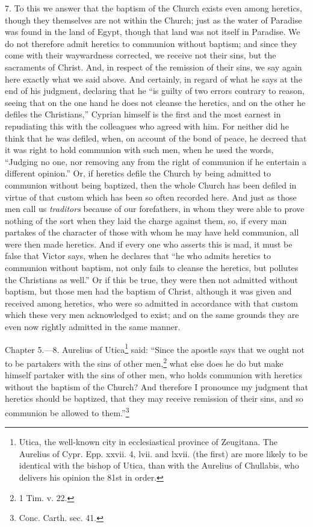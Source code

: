 7. To this we answer that the baptism of the Church exists even among heretics, though they themselves are not within the Church; just as the water of Paradise was found in the land of Egypt, though that land was not itself in Paradise. We do not therefore admit heretics to communion without baptism; and since they come with their waywardness corrected, we receive not their sins, but the sacraments of Christ. And, in respect of the remission of their sins, we say again here exactly what we said above. And certainly, in regard of what he says at the end of his judgment, declaring that he ``is guilty of two errors contrary to reason, seeing that on the one hand he does not cleanse the heretics, and on the other he defiles the Christians,'' Cyprian himself is the first and the most earnest in repudiating this with the colleagues who agreed with him. For neither did he think that he was defiled, when, on account of the bond of peace, he decreed that it was right to hold communion with such men, when he used the words, ``Judging no one, nor removing any from the right of communion if he entertain a different opinion.'' Or, if heretics defile the Church by being admitted to communion without being baptized, then the whole Church has been defiled in virtue of that custom which has been so often recorded here. And just as those men call us \emph{traditors} because of our forefathers, in whom they were able to prove nothing of the sort when they laid the charge against them, so, if every man partakes of the character of those with whom he may have held communion, all were then made heretics. And if every one who asserts this is mad, it must be false that Victor says, when he declares that ``he who admits heretics to communion without baptism, not only fails to cleanse the heretics, but pollutes the Christians as well.'' Or if this be true, they were then not admitted without baptism, but those men had the baptism of Christ, although it was given and received among heretics, who were so admitted in accordance with that custom which these very men acknowledged to exist; and on the same grounds they are even now rightly admitted in the same manner.


Chapter 5.—8. Aurelius of Utica\footnote{\par  Utica, the well-known city in ecclesiastical province of Zeugitana. The Aurelius of Cypr. Epp. xxvii. 4, lvii. and lxvii. (the first) are more likely to be identical with the bishop of Utica, than with the Aurelius of Chullabis, who delivers his opinion the 81st in order.} said: ``Since the apostle says that we ought not to be partakers with the sins of other men,\footnote{\par  1 Tim. v. 22.} what else does he do but make himself partaker with the sins of other men, who holds communion with heretics without the baptism of the Church? And therefore I pronounce my judgment that heretics should be baptized, that they may receive remission of their sins, and so communion be allowed to them.''\footnote{\par  Conc. Carth. sec. 41.}

